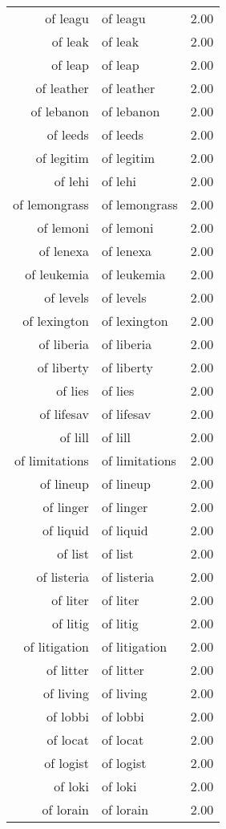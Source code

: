 \begin{table}[ht]
\begin{tabular}{rlr}
  of leagu & of leagu & 2.00 \\ 
  of leak & of leak & 2.00 \\ 
  of leap & of leap & 2.00 \\ 
  of leather & of leather & 2.00 \\ 
  of lebanon & of lebanon & 2.00 \\ 
  of leeds & of leeds & 2.00 \\ 
  of legitim & of legitim & 2.00 \\ 
  of lehi & of lehi & 2.00 \\ 
  of lemongrass & of lemongrass & 2.00 \\ 
  of lemoni & of lemoni & 2.00 \\ 
  of lenexa & of lenexa & 2.00 \\ 
  of leukemia & of leukemia & 2.00 \\ 
  of levels & of levels & 2.00 \\ 
  of lexington & of lexington & 2.00 \\ 
  of liberia & of liberia & 2.00 \\ 
  of liberty & of liberty & 2.00 \\ 
  of lies & of lies & 2.00 \\ 
  of lifesav & of lifesav & 2.00 \\ 
  of lill & of lill & 2.00 \\ 
  of limitations & of limitations & 2.00 \\ 
  of lineup & of lineup & 2.00 \\ 
  of linger & of linger & 2.00 \\ 
  of liquid & of liquid & 2.00 \\ 
  of list & of list & 2.00 \\ 
  of listeria & of listeria & 2.00 \\ 
  of liter & of liter & 2.00 \\ 
  of litig & of litig & 2.00 \\ 
  of litigation & of litigation & 2.00 \\ 
  of litter & of litter & 2.00 \\ 
  of living & of living & 2.00 \\ 
  of lobbi & of lobbi & 2.00 \\ 
  of locat & of locat & 2.00 \\ 
  of logist & of logist & 2.00 \\ 
  of loki & of loki & 2.00 \\ 
  of lorain & of lorain & 2.00 \\ 

\end{tabular}
\end{table}

